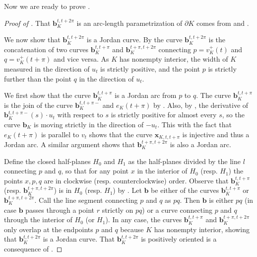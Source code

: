 Now we are ready to prove .

\begin{proof}[Proof of ]
That \(\mathbf{b}_K^{t, t + 2\pi}\) is an arc-length parametrization of \(\partial K\) comes from  and .

We now show that \(\mathbf{b}_K^{t, t + 2\pi}\) is a Jordan curve. By  the curve \(\mathbf{b}_K^{t, t + 2\pi}\) is the concatenation of two curves \(\mathbf{b}_K^{t, t + \pi}\) and \(\mathbf{b}_K^{t + \pi, t + 2\pi}\) connecting \(p = v_{K}^+(t)\) and \(q = v_K^+(t + \pi)\) and vice versa. As \(K\) has nonempty interior, the width of \(K\) measured in the direction of \(u_t\) is strictly positive, and the point \(p\) is strictly further than the point \(q\) in the direction of \(u_t\).

We first show that the curve \(\mathbf{b}_K^{t, t + \pi}\) is a Jordan arc from \(p\) to \(q\). The curve \(\mathbf{b}_K^{t, t + \pi}\) is the join of the curve \(\mathbf{b}_K^{t, t + \pi-}\) and \(e_{K}(t + \pi)\) by . Also, by , the derivative of \(\mathbf{b}_K^{t, t + \pi-}(s) \cdot u_t\) with respect to \(s\) is strictly positive for almost every \(s\), so the curve \(\mathbf{b}_K\) is moving strictly in the direction of \(-u_t\). This with the fact that \(e_K(t + \pi)\) is parallel to \(v_t\) shows that the curve \(\mathbf{x}_{K, t, t + \pi}\) is injective and thus a Jordan arc. A similar argument shows that \(\mathbf{b}_K^{t + \pi, t + 2\pi}\) is also a Jordan arc.

Define the closed half-planes \(H_0\) and \(H_1\) as the half-planes divided by the line \(l\) connecting \(p\) and \(q\), so that for any point \(x\) in the interior of \(H_0\) (resp. \(H_1\)) the points \(x, p, q\) are in clockwise (resp. counterclockwise) order. Observe that \(\mathbf{b}_K^{t, t + \pi}\) (resp. \(\mathbf{b}_K^{t + \pi, t + 2\pi}\)) is in \(H_0\) (resp. \(H_1\)) by . Let \(\mathbf{b}\) be either of the curves \(\mathbf{b}_K^{t, t + \pi}\) or \(\mathbf{b}_K^{t + \pi, t + 2\pi}\). Call the line segment connecting \(p\) and \(q\) as \(pq\). Then \(\mathbf{b}\) is either \(pq\) (in case \(\mathbf{b}\) passes through a point \(r\) strictly on \(pq\)) or a curve connecting \(p\) and \(q\) through the interior of \(H_0\) (or \(H_1\)). In any case, the curves \(\mathbf{b}_K^{t, t + \pi}\) and \(\mathbf{b}_K^{t + \pi, t + 2\pi}\) only overlap at the endpoints \(p\) and \(q\) because \(K\) has nonempty interior, showing that \(\mathbf{b}_K^{t, t + 2\pi}\) is a Jordan curve. That \(\mathbf{b}_K^{t, t + 2\pi}\) is positively oriented is a consequence of .
\end{proof}

